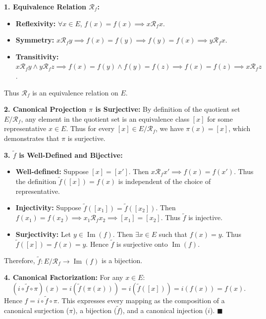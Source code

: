 \begin{solution}
\textbf{1. Equivalence Relation $\mathcal{R}_f$:}
\begin{itemize}[leftmargin=1.5em,itemsep=1pt]
  \item \textbf{Reflexivity:} $\forall x \in E$, $f(x) = f(x) \implies x \mathcal{R}_f x$.
  \item \textbf{Symmetry:} $x \mathcal{R}_f y \implies f(x) = f(y) \implies f(y) = f(x) \implies y \mathcal{R}_f x$.
  \item \textbf{Transitivity:} $x \mathcal{R}_f y \land y \mathcal{R}_f z \implies f(x) = f(y) \land f(y) = f(z) \implies f(x) = f(z) \implies x \mathcal{R}_f z$.
\end{itemize}
Thus $\mathcal{R}_f$ is an equivalence relation on $E$.

\textbf{2. Canonical Projection $\pi$ is Surjective:}
By definition of the quotient set $E/\mathcal{R}_f$, any element in the quotient set is an equivalence class $[x]$ for some representative $x \in E$.
Thus for every $[x] \in E/\mathcal{R}_f$, we have $\pi(x) = [x]$, which demonstrates that $\pi$ is surjective.

\textbf{3. $\tilde{f}$ is Well-Defined and Bijective:}
\begin{itemize}[leftmargin=1.5em,itemsep=2pt]
  \item \textbf{Well-defined:} Suppose $[x] = [x']$. Then $x \mathcal{R}_f x' \implies f(x) = f(x')$. Thus the definition $\tilde{f}([x]) = f(x)$ is independent of the choice of representative.
  \item \textbf{Injectivity:} Suppose $\tilde{f}([x_1]) = \tilde{f}([x_2])$. Then $f(x_1) = f(x_2) \implies x_1 \mathcal{R}_f x_2 \implies [x_1] = [x_2]$. Thus $\tilde{f}$ is injective.
  \item \textbf{Surjectivity:} Let $y \in \operatorname{Im}(f)$. Then $\exists x \in E$ such that $f(x) = y$. Thus $\tilde{f}([x]) = f(x) = y$. Hence $\tilde{f}$ is surjective onto $\operatorname{Im}(f)$.
\end{itemize}
Therefore, $\tilde{f}: E/\mathcal{R}_f \to \operatorname{Im}(f)$ is a bijection.

\textbf{4. Canonical Factorization:}
For any $x \in E$:
\[
(i \circ \tilde{f} \circ \pi)(x) = i(\tilde{f}(\pi(x))) = i(\tilde{f}([x])) = i(f(x)) = f(x).
\]
Hence $f = i \circ \tilde{f} \circ \pi$.
This expresses every mapping as the composition of a canonical surjection ($\pi$), a bijection ($\tilde{f}$), and a canonical injection ($i$). \hfill $\blacksquare$
\end{solution}
